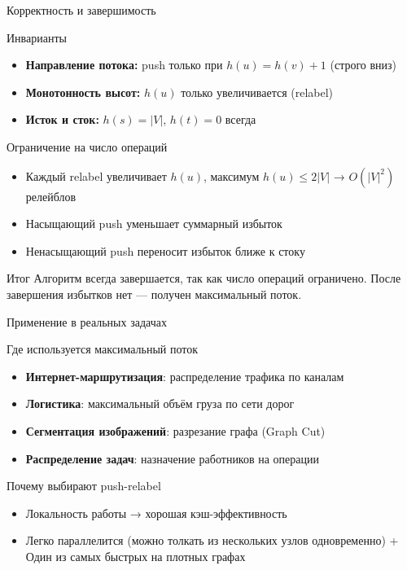 \documentclass[14pt, aspectratio=169]{beamer}
\begin{document}
\begin{frame}{Корректность и завершимость}
\scriptsize

\begin{block}{Инварианты}
\begin{itemize}
\item \textbf{Направление потока:} push только при $h(u) = h(v) + 1$ (строго вниз)
\item \textbf{Монотонность высот:} $h(u)$ только увеличивается (relabel)
\item \textbf{Исток и сток:} $h(s) = |V|$, $h(t) = 0$ всегда
\end{itemize}
\end{block}

\begin{block}{Ограничение на число операций}
\begin{itemize}
\item Каждый relabel увеличивает $h(u)$, максимум $h(u) \le 2|V|$ → $O(|V|^2)$ релейблов
\item Насыщающий push уменьшает суммарный избыток
\item Ненасыщающий push переносит избыток ближе к стоку
\end{itemize}
\end{block}

\begin{block}{Итог}
Алгоритм всегда завершается, так как число операций ограничено. После завершения избытков нет — получен максимальный поток.
\end{block}

\end{frame}

\begin{frame}{Применение в реальных задачах}
\scriptsize
\begin{block}{Где используется максимальный поток}
\begin{itemize}
\item \textbf{Интернет-маршрутизация}: распределение трафика по каналам
\item \textbf{Логистика}: максимальный объём груза по сети дорог
\item \textbf{Сегментация изображений}: разрезание графа (Graph Cut)
\item \textbf{Распределение задач}: назначение работников на операции
\end{itemize}
\end{block}

\begin{block}{Почему выбирают push-relabel}
\begin{itemize}
\item Локальность работы → хорошая кэш-эффективность
\item Легко параллелится (можно толкать из нескольких узлов одновременно)
+ Один из самых быстрых на плотных графах
\end{itemize}
\end{block}

\end{frame}
\end{document}
